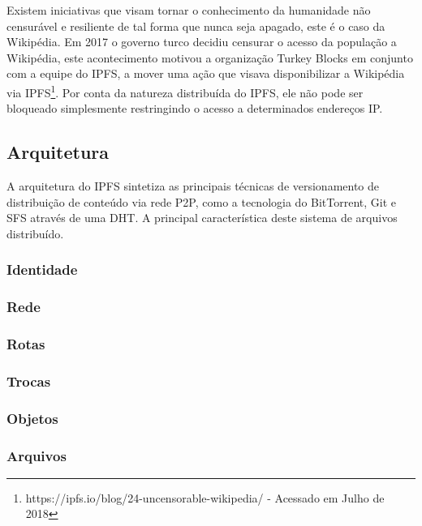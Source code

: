 \documentclass[tcc,capa]{texufpel}
\begin{document}
    Existem iniciativas que visam tornar o conhecimento da humanidade não censurável e resiliente de tal forma que nunca seja apagado, este é o caso da Wikipédia. Em 2017 o governo turco decidiu censurar o acesso da população a Wikipédia, este acontecimento motivou a organização Turkey Blocks em conjunto com a equipe do IPFS, a mover uma ação que visava disponibilizar a Wikipédia via IPFS\footnote{https://ipfs.io/blog/24-uncensorable-wikipedia/ - Acessado em Julho de 2018}. Por conta da natureza distribuída do IPFS, ele não pode ser bloqueado simplesmente restringindo o acesso a determinados endereços IP.

	\subsection{Arquitetura}
	    
	    A arquitetura do IPFS sintetiza as principais técnicas de versionamento de distribuição de conteúdo via rede P2P, como a tecnologia do BitTorrent, Git e SFS através de uma DHT. A principal característica deste sistema de arquivos distribuído.
    
    	\subsubsection{Identidade}
        
        \subsubsection{Rede}
        
        \subsubsection{Rotas}
        
        \subsubsection{Trocas}
        
        \subsubsection{Objetos}
        
        \subsubsection{Arquivos}
        
\end{document}
